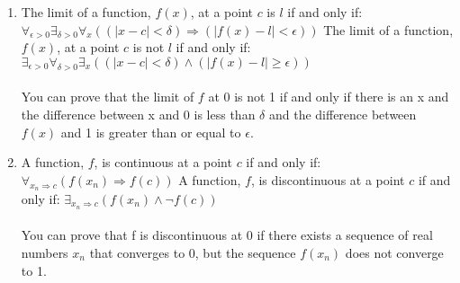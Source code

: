 \documentclass[]{article}
\begin{document}
\begin{enumerate}
    \item The limit of a function, $f(x)$, at a point $c$ is $l$ if and only if:
    \newline $\forall _{\epsilon>0} \exists_{ \delta>0}\forall _x((|x-c|<\delta)\Rightarrow(|f(x)-l|<\epsilon))$
    \newline The limit of a function, $f(x)$, at a point $c$ is not $l$ if and only if:
    \newline $\exists _{\epsilon>0} \forall _{\delta>0}\exists_{x}((|x-c|< \delta) \land (|f(x)-l|\geq \epsilon))$
    \\\\ You can prove that the limit of $f$ at 0 is not 1 if and only if there is an x and the difference between x and 0 is less than $\delta$ and the difference between $f(x)$ and 1 is greater than or equal to $\epsilon$.
    
    \item A function, $f$, is continuous at a point $c$ if and only if:
    \newline $\forall _{x_n \Rightarrow c}(f(x_n)\Rightarrow f(c))$
    \newline A function, $f$, is discontinuous at a point $c$ if and only if:
    \newline $\exists _{x_n \Rightarrow c}(f(x_n) \land \neg f(c))$
    \\\\ You can prove that f is discontinuous at 0 if there exists a sequence of real numbers $x_n$ that converges to 0, but the sequence $f(x_n)$ does not converge to 1.


\end{enumerate}
\end{document}
